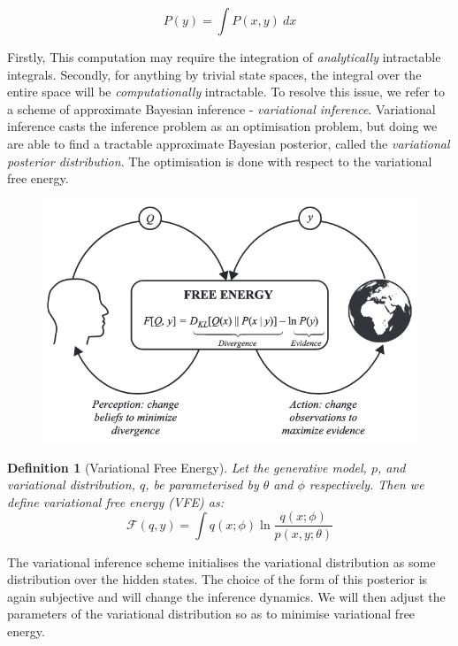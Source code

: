 \documentclass{article}
\newtheorem{definition}{Definition}
\begin{document}
\begin{equation}
	P(y) = \int P(x, y) \ dx
\end{equation}

Firstly, This computation may require the integration of \textit{analytically} intractable integrals. Secondly, for anything by trivial state spaces, the integral over the entire space will be \textit{computationally} intractable. To resolve this issue, we refer to a scheme of approximate Bayesian inference - \textit{variational inference}. Variational inference casts the inference problem as an optimisation problem, but doing we are able to find a tractable approximate Bayesian posterior, called the \textit{variational posterior distribution}. The optimisation is done with respect to the variational free energy.

\begin{figure}[htbp]
    \centering
    \includegraphics[scale=0.55]{images/vfe_minimisation.png}
    \caption{\citet{parr2022ActiveInference}}
    \label{fig:vfe_minimisation}
\end{figure}


\begin{definition}[Variational Free Energy]\label{def:variational_free_energy}
Let the generative model, $p$, and variational distribution, $q$, be parameterised by $\theta$ and $\phi$ respectively. Then we define variational free energy (VFE) as:
	$$
	\mathcal{F}(q, y) =  \int q(x; \phi) \ln \frac{q(x; \phi)}{p(x, y; \theta)}
	$$
\end{definition}

The variational inference scheme initialises the variational distribution as some distribution over the hidden states. The choice of the form of this posterior is again subjective and will change the inference dynamics. We will then adjust the parameters of the variational distribution so as to minimise variational free energy.
\end{document}

